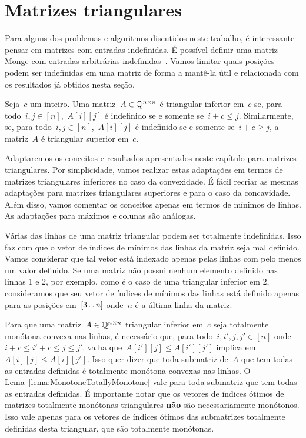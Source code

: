 
\section{Matrizes triangulares} \label{Monge:Triangular} 

Para alguns dos problemas e algoritmos discutidos neste trabalho, é interessante pensar em matrizes com entradas indefinidas. É possível definir uma matriz Monge com entradas arbitrárias indefinidas~\cite[Seção 9.4]{Burkard:1996}. Vamos limitar quais posições podem ser indefinidas em uma matriz de forma a mantê-la útil e relacionada com os resultados já obtidos nesta seção. 

\begin{defi}
Seja~$c$ um inteiro. Uma matriz~$A \in \mathbb{Q}^{n \times n}$ é triangular inferior em~$c$ se, para todo~${ i,j \in [n] }$,~$A[i][j]$ é indefinido se e somente se~${ i + c \leq j }$. Similarmente, se, para todo~${i,j \in [n]}$,~$A[i][j]$ é indefinido se e somente se~${ i + c \geq j }$, a matriz~$A$ é triangular superior em~$c$.
\end{defi}

Adaptaremos os conceitos e resultados apresentados neste capítulo para matrizes triangulares. Por simplicidade, vamos realizar estas adaptações em termos de matrizes triangulares inferiores no caso da convexidade. É fácil recriar as mesmas adaptações para matrizes triangulares superiores e para o caso da concavidade. Além disso, vamos comentar os conceitos apenas em termos de mínimos de linhas. As adaptações para máximos e colunas são análogas.

Várias das linhas de uma matriz triangular podem ser totalmente indefinidas. Isso faz com que o vetor de índices de mínimos das linhas da matriz seja mal definido. Vamos considerar que tal vetor está indexado apenas pelas linhas com pelo menos um valor definido. Se uma matriz não possui nenhum elemento definido nas linhas 1 e 2, por exemplo, como é o caso de uma triangular inferior em 2, consideramos que seu vetor de índices de mínimos das linhas está definido apenas para as posições em~$[3 \,.\,.\, n]$ onde~$n$ é a última linha da matriz.

Para que uma matriz~$A \in \mathbb{Q}^{n \times n}$ triangular inferior em~$c$ seja totalmente monótona convexa nas linhas, é necessário que, para todo~${ i,i',j,j' \in [n] }$ onde~${ i + c \leq i' + c \leq j \leq j'}$, valha que~${ A[i'][j] \leq A[i'][j'] }$ implica em~${ A[i][j] \leq A[i][j'] }$. Isso quer dizer que toda submatriz de~$A$ que tem todas as entradas definidas é totalmente monótona convexas nas linhas. O Lema~\ref{lema:MonotoneTotallyMonotone} vale para toda submatriz que tem todas as entradas definidas. É importante notar que os vetores de índices ótimos de matrizes totalmente monótonas triangulares \textbf{não} são necessariamente monótonos. Isso vale apenas para os vetores de índices ótimos das submatrizes totalmente definidas desta triangular, que são totalmente monótonas.

